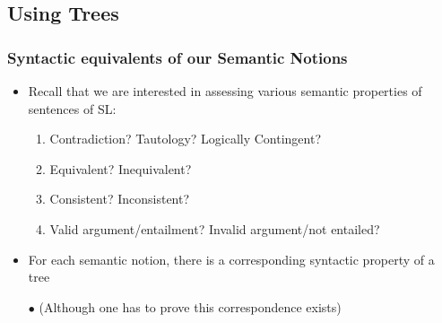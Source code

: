 






\subsection{Using Trees}

\begin{frame}
\frametitle{Syntactic equivalents of our Semantic Notions}

\begin{itemize}[<+->]

\item Recall that we are interested in assessing various semantic properties of sentences of SL:

\bigskip

\begin{enumerate}[1.)]

\item Contradiction? Tautology? Logically Contingent?

\item Equivalent? Inequivalent?

\item Consistent? Inconsistent? 

\item Valid argument/entailment? Invalid argument/not entailed?

\end{enumerate}

\bigskip

\item For each semantic notion, there is a corresponding syntactic property of a tree 


\medskip $\bullet$ (Although one has to prove this correspondence exists)


\end{itemize}
\end{frame}

